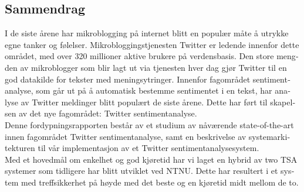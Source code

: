 
\begin{otherlanguage}{norsk}

\section*{Sammendrag}
I de siste årene har mikroblogging på internet blitt en populær måte å utrykke egne tanker og følelser. Mikrobloggingstjenesten Twitter er ledende innenfor dette området, med over 320 millioner aktive brukere på verdensbasis. Den store mengden av mikroblogger som blir lagt ut via tjenesten hver dag gjør Twitter til en god datakilde for tekster med meningsytringer.  Innenfor fagområdet sentimentanalyse, som går ut på å automatisk bestemme sentimentet i en tekst, har analyse av Twitter meldinger blitt populært de siste årene. Dette har ført til skapelsen av det nye fagområdet: Twitter sentimentanalyse. \\

Denne fordypningsrapporten består av et studium av nåværende state-of-the-art innen fagområdet Twitter sentimentanalyse, samt en beskrivelse av systemarkitekturen til vår implementasjon av et Twitter sentimentanalysesystem. \\

Med et hovedmål om enkelhet og god kjøretid har vi laget en hybrid av two TSA systemer som tidligere har blitt utviklet ved NTNU. Dette har resultert i et system med treffsikkerhet på høyde med det beste og en kjøretid midt mellom de to.

\end{otherlanguage}
